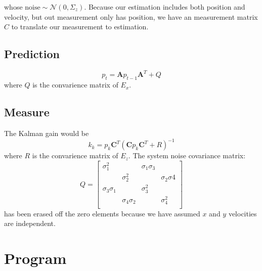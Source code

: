 \documentclass[12pt]{article}
\begin{document}
	whose $\text{noise}\sim\mathcal{N}\left(0,\Sigma_z\right)$. Because our estimation includes both position and velocity, but out measurement only has position, we have an measurement matrix $C$ to translate our measurement to estimation.

	\subsection{Prediction}\label{sub:predict}
	\begin{equation}
		p_t=\mathbf{A}p_{t-1}\mathbf{A}^T+Q
	\end{equation}
	where $Q$ is the convarience matrix of $E_x$.

	\subsection{Measure}\label{sub:measure}
	The Kalman gain would be
	\begin{equation}
		k_k=p_k\mathbf{C}^T{\left(\mathbf{C}p_k\mathbf{C}^T+R\right)}^{-1}
	\end{equation}
	where $R$ is the convarience matrix of $E_z$. The system noise covariance matrix:
	\begin{equation}
		Q=
		\begin{bmatrix}
			\sigma_1^2       &                  & \sigma_1\sigma_3 &                 \\
			                 & \sigma_2^2       &                  & \sigma_2\sigma4 \\
			\sigma_3\sigma_1 &                  & \sigma_3^2       &                 \\
			                 & \sigma_4\sigma_2 &                  & \sigma_4^2      \\
		\end{bmatrix}
	\end{equation}
	has been erased off the zero elements because we have assumed $x$ and $y$ velocities are independent.
	\section{Program}\label{sec:program}
\end{document}
